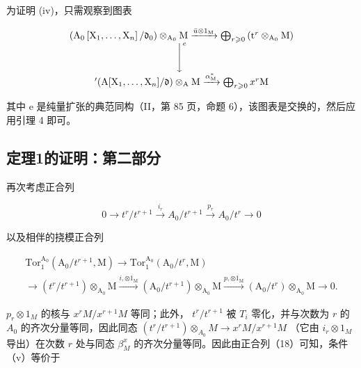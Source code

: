 为证明 (iv)，只需观察到图表

\[
\begin{array}{c} \left(\mathrm{A} _ {0} \left[ \mathrm{X} _ {1}, \dots , \mathrm{X} _ {n} \right] / \mathfrak {d} _ {0}\right) \otimes_ {\mathrm{A} _ {0}} \mathrm{M} \xrightarrow {\bar {u} \otimes 1 _ {\mathrm{M}}} \bigoplus_ {r \geqslant 0} \left(\mathrm{t} ^ {r} \otimes_ {\mathrm{A} _ {0}} \mathrm{M}\right) \\ \Bigg \downarrow^ {e} \\ ^ {\prime} (\mathrm{A} [ \mathrm{X} _ {1}, \dots , \mathrm{X} _ {n} ] / \mathfrak {d}) \otimes_ {\mathrm{A}} \mathrm{M} \xrightarrow {\alpha_ {\mathrm{M}} ^ {*}} \bigoplus_ {r \geqslant 0} x ^ {r} \mathrm{M} \end{array}
\]

其中 e 是纯量扩张的典范同构（II，第 85 页，命题 6），该图表是交换的，然后应用引理 4 即可。

\subsection{定理1的证明：第二部分}

再次考虑正合列

\[
0 \longrightarrow t ^ {r} / t ^ {r + 1} \xrightarrow {i _ {r}} A _ {0} / t ^ {r + 1} \xrightarrow {p _ {r}} A _ {0} / t ^ {r} \longrightarrow 0\tag{16}
\]

以及相伴的挠模正合列

\[
\begin{array}{l} \text {Tor} _ {1} ^ {\mathrm{A} _ {0}} (\mathrm{A} _ {0} / t ^ {r + 1}, \mathrm{M}) \longrightarrow \mathrm{Tor} _ {1} ^ {\mathrm{A} _ {0}} (\mathrm{A} _ {0} / t ^ {r}, \mathrm{M}) \\ \longrightarrow (t ^ {r} / t ^ {r + 1}) \otimes_ {\mathrm{A} _ {0}} \mathrm{M} \xrightarrow {i , \otimes 1 _ {\mathrm{M}}} (\mathrm{A} _ {0} / t ^ {r + 1}) \otimes_ {\mathrm{A} _ {0}} \mathrm{M} \xrightarrow {p , \otimes 1 _ {\mathrm{M}}} (\mathrm{A} _ {0} / t ^ {r}) \otimes_ {\mathrm{A} _ {0}} \mathrm{M} \longrightarrow 0. \end{array} \tag {18}
\]

\(p_r \otimes 1_M\) 的核与 \(x^r M/x^{r+1} M\) 等同；此外， \(t^r/t^{r+1}\) 被 \(T_i\) 零化，并与次数为 \(r\) 的 \(A_0\) 的齐次分量等同，因此同态 \((t^r/t^{r+1}) \otimes_{A_0} M \to x^r M/x^{r+1} M\) （它由 \(i_r \otimes 1_M\) 导出）在次数 \(r\) 处与同态 \(\beta_M^x\) 的齐次分量等同。因此由正合列（18）可知，条件（v）等价于

